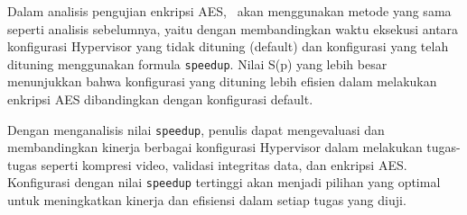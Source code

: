 Dalam analisis pengujian enkripsi AES, \saya\ akan menggunakan metode yang sama seperti analisis sebelumnya, yaitu dengan membandingkan waktu eksekusi antara konfigurasi Hypervisor yang tidak dituning (default) dan konfigurasi yang telah dituning menggunakan formula \texttt{speedup}. Nilai S(p) yang lebih besar menunjukkan bahwa konfigurasi yang dituning lebih efisien dalam melakukan enkripsi AES dibandingkan dengan konfigurasi default.

Dengan menganalisis nilai \texttt{speedup}, penulis dapat mengevaluasi dan membandingkan kinerja berbagai konfigurasi Hypervisor dalam melakukan tugas-tugas seperti kompresi video, validasi integritas data, dan enkripsi AES. Konfigurasi dengan nilai \texttt{speedup} tertinggi akan menjadi pilihan yang optimal untuk meningkatkan kinerja dan efisiensi dalam setiap tugas yang diuji.